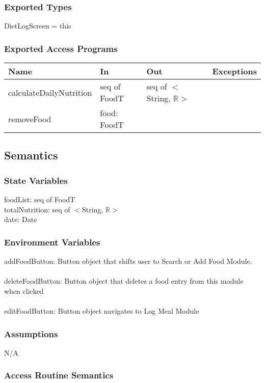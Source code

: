 \documentclass[12pt, titlepage]{article}
\begin{document}
\subsubsection{Exported Types}
DietLogScreen = this

\subsubsection{Exported Access Programs}

\begin{tabular}{| l | l | l | l |}
	\hline
	{\textbf{Name}} & {\textbf{In}} & {\textbf{Out}} & {\textbf{Exceptions}}\\
	\hline
	{calculateDailyNutrition} &seq of FoodT &seq of $<$String, \(\mathbb{R}\)$>$ &\\
	\hline
	{removeFood} &food: FoodT & & \\
	\hline
\end{tabular}

\subsection{Semantics}

\subsubsection{State Variables}
foodList: seq of FoodT\\
totalNutrition: seq of $<$String, \(\mathbb{R}\)$>$\\
date: Date

\subsubsection{Environment Variables}

addFoodButton: Button object that shifts user to Search or Add Food Module.\\\\
deleteFoodButton: Button object that deletes a food entry from this module when clicked\\\\
editFoodButton: Button object navigates to Log Meal Module


\subsubsection{Assumptions}

N/A

\subsubsection{Access Routine Semantics}
\end{document}
